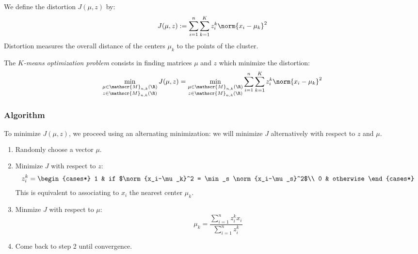 \documentclass[toc, titlepaged]{../cs-classes/cs-classes}
\begin{document}
\begin{definition}[Distortion]
    We define the distortion $J(\mu, z)$ by:
    \begin{equation}
        J(\mu, z) := \sum_{i=1}^n \sum_{k=1}^K z_i^k \norm{x_i-\mu_k}^2
    \end{equation}
    Distortion measures the overall distance of the centers $\mu_k$ to the points of the cluster.
\end{definition}

\begin{definition}
    The \emph{$K$-means optimization problem} consists in finding matrices $\mu$ and $z$ which minimize the distortion:
    \begin{equation}
        \min_{\substack{\mu\in\mathscr{M}_{n, k}(\R)\\z\in\mathscr{M}_{n, k}(\R)}} J(\mu, z) = \min_{\substack{\mu\in\mathscr{M}_{n, k}(\R)\\z\in\mathscr{M}_{n, k}(\R)}} \sum_{i=1}^n \sum_{k=1}^K z_i^k \norm{x_i-\mu_k}^2
    \end{equation}
\end{definition}

\subsubsection{Algorithm}
To minimize $J(\mu, z)$, we proceed using an alternating minimization: we will minimize $J$ alternatively with respect to $z$ and $\mu$.

\begin{enumerate}
    \item Randomly choose a vector $\mu$.
    \item Minimize $J$ with respect to $z$:
    \begin{equation}
        z_i^k = \begin{cases*}
            1 & if $\norm{x_i-\mu_k}^2 = \min_s \norm{x_i-\mu_s}^2$\\
            0 & otherwise
        \end{cases*}
    \end{equation}
    This is equivalent to associating to $x_i$ the nearest center $\mu_k$.
    \item Minmize $J$ with respect to $\mu$:
    \begin{equation}
        \label{eq:minimize-mu}
        \mu_k = \frac{\sum_{i=1}^n z_i^k x_i}{\sum_{i=1}^n z_i^k}
    \end{equation}
    \item Come back to step 2 until convergence.
\end{enumerate}
\end{document}
